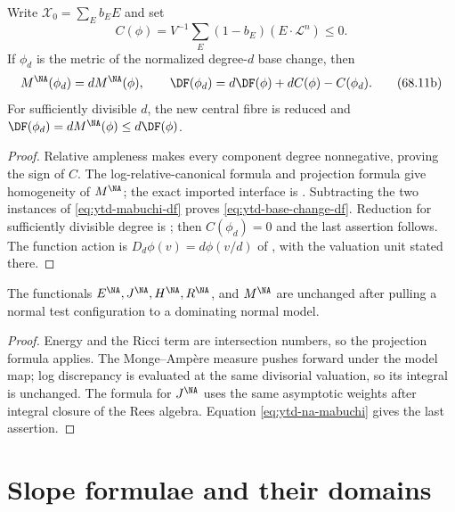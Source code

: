 \begin{proposition}
\label{prop:ytd-base-change-correction}
Write $\mathcal X_0=\sum_E b_E E$ and set
\[
 C(\phi)=V^{-1}\sum_E(1-b_E)(E\cdot\mathcal L^n)\leq0.
\tag{68.11a}\label{eq:ytd-correction-sum}
\]
If $\phi_d$ is the metric of the normalized degree-$d$ base change, then
\[
 M^{\NA}(\phi_d)=dM^{\NA}(\phi),\qquad
 \DF(\phi_d)=d\DF(\phi)+dC(\phi)-C(\phi_d).
\tag{68.11b}\label{eq:ytd-base-change-df}
\]
For sufficiently divisible $d$, the new central fibre is reduced and
$\DF(\phi_d)=dM^{\NA}(\phi)\leq d\DF(\phi)$.
\end{proposition}

\begin{proof}
Relative ampleness makes every component degree nonnegative, proving the
sign of $C$. The log-relative-canonical formula and projection formula give
homogeneity of $M^{\NA}$; the exact imported interface is
\cite[Proposition~7.14]{BHJ17}. Subtracting the two instances of
\eqref{eq:ytd-mabuchi-df} proves \eqref{eq:ytd-base-change-df}.
Reduction for sufficiently divisible degree is
\cite[Proposition~7.16]{BHJ17}; then $C(\phi_d)=0$ and the last assertion
follows. The function action is $D_d\phi(v)=d\phi(v/d)$ of
, with the valuation unit stated there.
\end{proof}

\begin{proposition}\label{prop:ytd-birational-invariance}
The functionals $E^{\NA},J^{\NA},H^{\NA},R^{\NA}$, and
$M^{\NA}$ are unchanged after pulling a normal test configuration to
a dominating normal model.
\end{proposition}

\begin{proof}
Energy and the Ricci term are intersection numbers, so the projection
formula applies. The Monge--Amp\`ere measure pushes forward under the
model map; log discrepancy is evaluated at the same divisorial
valuation, so its integral is unchanged. The formula for $J^{\NA}$
uses the same asymptotic weights after integral closure of the Rees
algebra. Equation \eqref{eq:ytd-na-mabuchi} gives the last assertion.
\end{proof}

\section{Slope formulae and their domains}
\label{sec:ytd-slopes}

